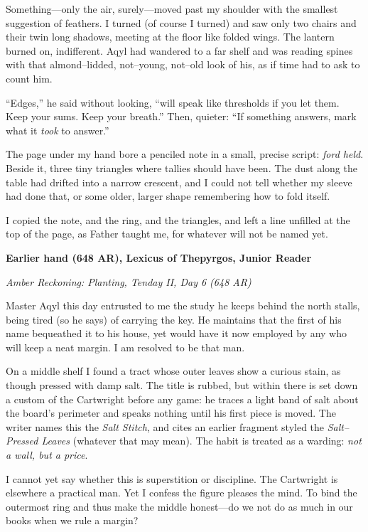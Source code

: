 \documentclass[11pt]{article}
\begin{document}
Something—only the air, surely—moved past my shoulder with the smallest suggestion of feathers. I turned (of course I turned) and saw only two chairs and their twin long shadows, meeting at the floor like folded wings. The lantern burned on, indifferent. Aqyl had wandered to a far shelf and was reading spines with that almond–lidded, not–young, not–old look of his, as if time had to ask to count him.

“Edges,” he said without looking, “will speak like thresholds if you let them. Keep your sums. Keep your breath.” Then, quieter: “If something answers, mark what it \emph{took} to answer.”

The page under my hand bore a penciled note in a small, precise script: \textit{ford held}. Beside it, three tiny triangles where tallies should have been. The dust along the table had drifted into a narrow crescent, and I could not tell whether my sleeve had done that, or some older, larger shape remembering how to fold itself.

I copied the note, and the ring, and the triangles, and left a line unfilled at the top of the page, as Father taught me, for whatever will not be named yet.

\medskip

\noindent\textbf{Earlier hand (648 AR), Lexicus of Thepyrgos, Junior Reader}

\noindent\textit{Amber Reckoning: Planting, Tenday II, Day 6 (648 AR)}

Master Aqyl this day entrusted to me the study he keeps behind the north stalls, being tired (so he says) of carrying the key. He maintains that the first of his name bequeathed it to his house, yet would have it now employed by any who will keep a neat margin. I am resolved to be that man.

On a middle shelf I found a tract whose outer leaves show a curious stain, as though pressed with damp salt. The title is rubbed, but within there is set down a custom of the Cartwright before any game: he traces a light band of salt about the board’s perimeter and speaks nothing until his first piece is moved. The writer names this the \textit{Salt Stitch}, and cites an earlier fragment styled the \textit{Salt–Pressed Leaves} (whatever that may mean). The habit is treated as a warding: \emph{not a wall, but a price}.

I cannot yet say whether this is superstition or discipline. The Cartwright is elsewhere a practical man. Yet I confess the figure pleases the mind. To bind the outermost ring and thus make the middle honest—do we not do as much in our books when we rule a margin?
\end{document}

